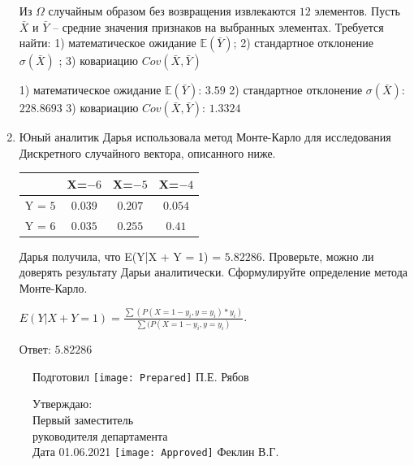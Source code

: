 \documentclass[a4paper,14pt]{article}
\begin{document}
\begin{enumerate}
Из $\Omega$ случайным образом без возвращения извлекаются $12$ элементов. 
Пусть $\bar X$ и $\bar Y$ – средние значения признаков на выбранных элементах. 
Требуется найти: 1) математическое ожидание $\mathbb{E}(\bar Y)$; 2) стандартное отклонение $\sigma(\bar X)$ ; 
3) ковариацию $Cov(\bar X, \bar Y)$




1) математическое ожидание $\mathbb{E}(\bar Y)$: $3.59$ 
2) стандартное отклонение $\sigma(\bar X)$: $228.8693$
3) ковариацию $Cov(\bar X, \bar Y)$: $1.3324$


\item

    
    	Юный аналитик Дарья использовала метод Монте-Карло для исследования Дискретного случайного вектора, описанного ниже.

        \begin{tabular}{|c|c|c|c|}
	\hline
	& X=$-6$ & X=$-5$ & X=$-4$ \\
	\hline
	Y = $5$ & $0.039$ & $0.207$  &  $0.054$ \\
	\hline
	Y = $6$ & $0.035$ & $0.255$ & $0.41$  \\
	\hline
\end{tabular}

    	Дарья получила, что E(Y|X + Y = 1) = $5.82286$.
    	Проверьте, можно ли доверять результату Дарьи аналитически. Сформулируйте определение метода Монте-Карло.
    


    
        $E(Y|X+Y=1) = \frac{\sum(P(X=1 - y_i, y=y_i) * y_i)}{\sum(P(X=1 - y_i, y=y_i)}$.

        Ответ: $5.82286$
    

\end{enumerate}

\begin{figure}[H]
	Подготовил
	\hfill
	\texttt{[image: Prepared]}
	П.Е. Рябов
\end{figure}


\begin{figure}[H]
	Утверждаю:\\
	Первый заместитель\\
	руководителя департамента\\
	Дата 01.06.2021
	\hfill
	\texttt{[image: Approved]}
	Феклин В.Г.
\end{figure}
\end{document}
